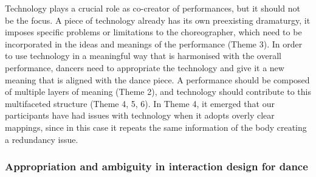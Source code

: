 Technology plays a crucial role as co-creator of performances, but it should not be the focus. A piece of technology already has its own preexisting dramaturgy, it imposes specific problems or limitations to the choreographer, which need to be incorporated in the ideas and meanings of the performance (Theme 3). %
In order to use technology in a meaningful way that is harmonised with the overall performance, dancers need to appropriate the technology and give it a new meaning that is aligned with the dance piece. A performance should be composed of multiple layers of meaning (Theme 2), and technology should contribute to this multifaceted structure (Theme 4, 5, 6). In Theme 4, it emerged that our participants have had issues with technology when it adopts overly clear mappings, since in this case it repeats the same information of the body creating a redundancy issue.  %

\subsubsection{Appropriation and ambiguity in interaction design for dance} 

